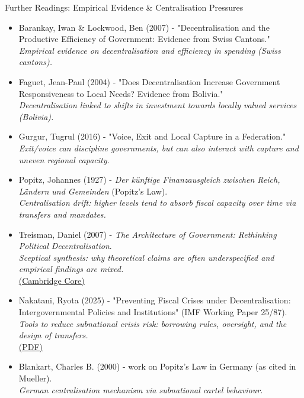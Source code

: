 \documentclass[10pt]{beamer}
\begin{document}
\begin{frame}[allowframebreaks]{Further Readings: Empirical Evidence \& Centralisation Pressures}
\footnotesize
\begin{itemize}
\item Barankay, Iwan \& Lockwood, Ben (2007) - "Decentralisation and the Productive Efficiency of Government: Evidence from Swiss Cantons."\\
\textit{Empirical evidence on decentralisation and efficiency in spending (Swiss cantons).}

\item Faguet, Jean-Paul (2004) - "Does Decentralisation Increase Government Responsiveness to Local Needs? Evidence from Bolivia."\\
\textit{Decentralisation linked to shifts in investment towards locally valued services (Bolivia).}

\item Gurgur, Tugrul (2016) - "Voice, Exit and Local Capture in a Federation."\\
\textit{Exit/voice can discipline governments, but can also interact with capture and uneven regional capacity.}

\item Popitz, Johannes (1927) - \textit{Der künftige Finanzausgleich zwischen Reich, Ländern und Gemeinden} (Popitz's Law).\\
\textit{Centralisation drift: higher levels tend to absorb fiscal capacity over time via transfers and mandates.}

\item Treisman, Daniel (2007) - \textit{The Architecture of Government: Rethinking Political Decentralisation}.\\
\textit{Sceptical synthesis: why theoretical claims are often underspecified and empirical findings are mixed.}\\
\href{https://www.cambridge.org/core/books/architecture-of-government/D9B2FD6886A1DF8E911A1ABAF5C1F50D}{(Cambridge Core)}

\item Nakatani, Ryota (2025) - "Preventing Fiscal Crises under Decentralisation: Intergovernmental Policies and Institutions" (IMF Working Paper 25/87).\\
\textit{Tools to reduce subnational crisis risk: borrowing rules, oversight, and the design of transfers.}\\
\href{https://www.imf.org/-/media/Files/Publications/WP/2025/English/wpiea2025087-print-pdf.ashx}{(PDF)}
\item Blankart, Charles B. (2000) - work on Popitz's Law in Germany (as cited in Mueller).\\
\textit{German centralisation mechanism via subnational cartel behaviour.}


\end{itemize}
\end{frame}
\end{document}
